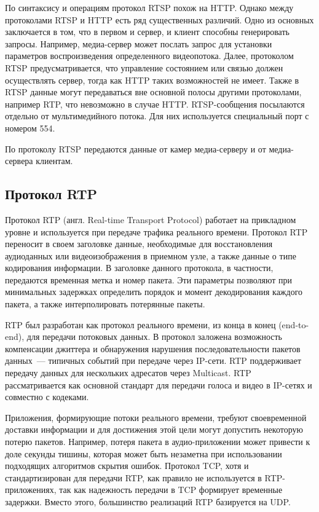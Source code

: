По синтаксису и операциям протокол RTSP похож на HTTP. Однако между протоколами RTSP и HTTP есть ряд
существенных различий. Одно из основных заключается в том, что в первом и сервер, и клиент способны
генерировать запросы. Например, медиа-сервер может послать запрос для установки параметров
воспроизведения определенного видеопотока. Далее, протоколом RTSP предусматривается, что управление
состоянием или связью должен осуществлять сервер, тогда как HTTP таких возможностей не имеет.
Также в RTSP данные могут передаваться вне основной полосы другими протоколами,
например RTP, что невозможно в случае HTTP. RTSP-сообщения посылаются отдельно от мультимедийного
потока. Для них используется специальный порт с номером 554.

По протоколу RTSP передаются данные от камер медиа-серверу и от медиа-сервера клиентам.

\subsection{Протокол RTP}
Протокол RTP (англ. Real-time Transport Protocol) работает на прикладном уровне и используется
при передаче трафика реального времени.
Протокол RTP переносит в своем заголовке данные, необходимые для восстановления аудиоданных или
видеоизображения в приемном узле, а также данные о типе кодирования информации. В заголовке данного
протокола, в частности, передаются временная метка и номер пакета. Эти параметры позволяют при
минимальных задержках определить порядок и момент декодирования каждого пакета, а также
интерполировать потерянные пакеты.

RTP был разработан как протокол реального времени, из конца в конец (end-to-end), для передачи
потоковых данных. В протокол заложена возможность компенсации джиттера и обнаружения нарушения
последовательности пакетов данных~--- типичных событий при передаче через IP-сети. RTP поддерживает
передачу данных для нескольких адресатов через Multicast. RTP рассматривается как основной стандарт
для передачи голоса и видео в IP-сетях и совместно с кодеками.

Приложения, формирующие потоки реального времени, требуют своевременной доставки информации и для
достижения этой цели могут допустить некоторую потерю пакетов. Например, потеря пакета в
аудио-приложении может привести к доле секунды тишины, которая может быть незаметна при
использовании подходящих алгоритмов скрытия ошибок. Протокол TCP, хотя и стандартизирован для
передачи RTP, как правило не используется в RTP-приложениях, так как надежность передачи в TCP
формирует временные задержки. Вместо этого, большинство реализаций RTP базируется на UDP.

